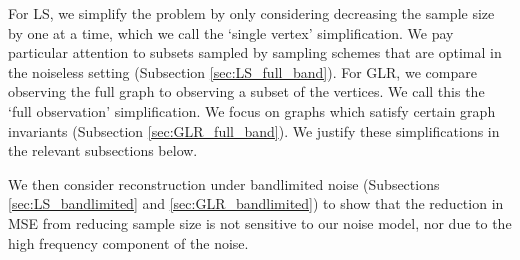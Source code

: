 \begin{figure}[htbp]
    \centering
    
    \caption{}
    \label{fig:theory_structure_flowchart}
\end{figure}


For LS, we simplify the problem by only considering decreasing the sample size by one at a time, which we call the `single vertex' simplification. We pay particular attention to subsets sampled by sampling schemes that are optimal in the noiseless setting (Subsection \ref{sec:LS_full_band}). For GLR, we compare observing the full graph to observing a subset of the vertices. We call this the `full observation' simplification. We focus on graphs which satisfy certain graph invariants (Subsection \ref{sec:GLR_full_band}). We justify these simplifications in the relevant subsections below.
 
We then consider reconstruction under bandlimited noise (Subsections \ref{sec:LS_bandlimited} and \ref{sec:GLR_bandlimited}) to show that the reduction in MSE from reducing sample size is not sensitive to our noise model, nor due to the high frequency component of the noise.


